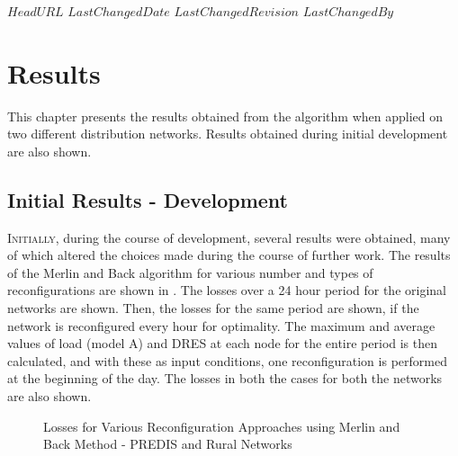 
\svnidlong
{$HeadURL$}
{$LastChangedDate$}
{$LastChangedRevision$}
{$LastChangedBy$}

\chapter{Results}

\begin{introduction}
  This chapter presents the results obtained from the algorithm when applied on two different distribution networks. Results obtained during initial development are also shown.
\end{introduction}

\section{Initial Results - Development}

\lettrine[nindent=0pt]{I}{nitially}, during the course of development, several results were obtained, many of which altered the choices made during the course of further work. The results of the Merlin and Back algorithm for various number and types of reconfigurations are shown in . The losses over a 24 hour period for the original networks are shown. Then, the losses for the same period are shown, if the network is reconfigured every hour for optimality. The maximum and average values of load (model A) and DRES at each node for the entire period is then calculated, and with these as input conditions, one reconfiguration is performed at the beginning of the day. The losses in both the cases for both the networks are also shown.\\

\begin{figure}[!h]
\begin{minipage}[!h]{.5\textwidth}
	\centering
    \setlength\figureheight{5cm}
    \setlength\figurewidth{6cm}
	
\end{minipage}
\begin{minipage}[!h]{.5\textwidth}
	\centering
	\setlength\figureheight{5cm}
    \setlength\figurewidth{6cm}
	
\end{minipage}
\caption{Losses for Various Reconfiguration Approaches using Merlin and Back Method - PREDIS and Rural Networks}
\end{figure}

